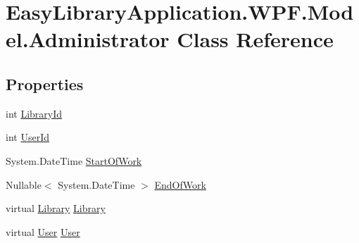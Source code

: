 \hypertarget{class_easy_library_application_1_1_w_p_f_1_1_model_1_1_administrator}{}\section{Easy\+Library\+Application.\+W\+P\+F.\+Model.\+Administrator Class Reference}
\label{class_easy_library_application_1_1_w_p_f_1_1_model_1_1_administrator}
\subsection*{Properties}
\begin{DoxyCompactItemize}
\item 
int \mbox{\hyperlink{class_easy_library_application_1_1_w_p_f_1_1_model_1_1_administrator_adbf1ce27cf300974ce7dda1e59aa52d1}{Library\+Id}}
\item 
int \mbox{\hyperlink{class_easy_library_application_1_1_w_p_f_1_1_model_1_1_administrator_acaa6f42217ef8451bca6cdb014d1554a}{User\+Id}}
\item 
System.\+Date\+Time \mbox{\hyperlink{class_easy_library_application_1_1_w_p_f_1_1_model_1_1_administrator_a469a2e28a60555d3e8500cdae2117a8d}{Start\+Of\+Work}}
\item 
Nullable$<$ System.\+Date\+Time $>$ \mbox{\hyperlink{class_easy_library_application_1_1_w_p_f_1_1_model_1_1_administrator_a641e0f70677169446063cc4bca5c09f2}{End\+Of\+Work}}
\item 
virtual \mbox{\hyperlink{class_easy_library_application_1_1_w_p_f_1_1_model_1_1_library}{Library}} \mbox{\hyperlink{class_easy_library_application_1_1_w_p_f_1_1_model_1_1_administrator_a6473ed3d0163b7d421f2b64b3d7cf69f}{Library}}
\item 
virtual \mbox{\hyperlink{class_easy_library_application_1_1_w_p_f_1_1_model_1_1_user}{User}} \mbox{\hyperlink{class_easy_library_application_1_1_w_p_f_1_1_model_1_1_administrator_a3ae41e492eca63c00f6a8e4f1b8eda3b}{User}}
\end{DoxyCompactItemize}


